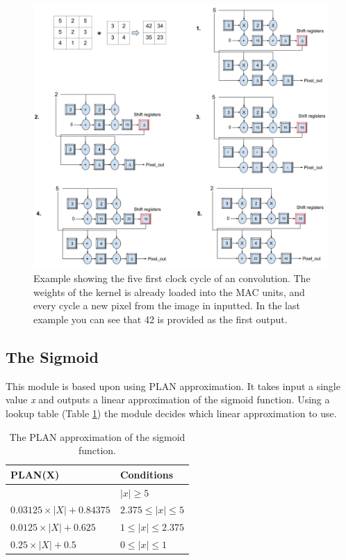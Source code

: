 \begin{figure}[h!]
  \centering
      \includegraphics[width=1.1\textwidth]{Figures/Method/Conv_example}
  \caption[Convolution example]{Example showing the five first clock cycle of an convolution. The weights of the kernel is already loaded into the MAC units, and every cycle a new pixel from the image in inputted. In the last example you can see that 42 is provided as the first output.}
\end{figure}

\subsection{The Sigmoid} 

This module is based upon \cite{Napocensis2009} using PLAN approximation. It takes input a single value \textit{x} and outputs a linear approximation of the sigmoid function. Using a lookup table (Table \ref{tab_sigmoid}) the module decides which linear approximation to use.


\begin{table}
	\centering
    \begin{tabular}{| >{\centering\arraybackslash}m{2in} | >{\centering\arraybackslash}m{1.2in} |} 
    \hline
    PLAN(X) & Conditions \\ \hline
    1 & $ |x| \geq 5 $ \\ \hline
    $ 0.03125 \times |X| + 0.84375 $ & $ 2.375 \leq |x| \le 5 $\\ \hline
    $ 0.0125 \times |X| + 0.625 $ & $ 1 \leq |x| \le 2.375 $\\ \hline
   	$ 0.25 \times |X| + 0.5 $ & $ 0 \leq |x| \le 1 $\\ \hline
    \end{tabular}
    \caption{The PLAN approximation of the sigmoid function.}
   	\label{tab_sigmoid}
    
\end{table}

